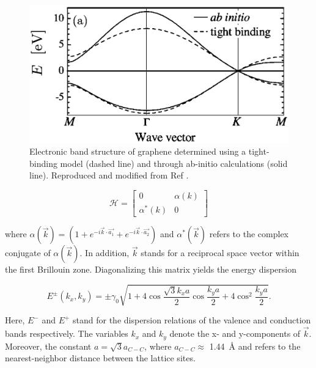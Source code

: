 \begin{figure}[h]
	\centering
	\includegraphics[scale=0.5]{images/chapter_optical_props/graphene_band_charlier}
	\caption{Electronic band structure of graphene determined using a tight-binding model (dashed line) and through ab-initio calculations (solid line). Reproduced and modified from Ref \cite{reich2002tight}.}
	\label{fig:graphene_band}
\end{figure}


\begin{equation}
	\mathcal{H} = \begin{bmatrix} 
	0 & \alpha(k) \\
	\alpha^*(k) & 0
	\end{bmatrix}
\end{equation}

where $\alpha(\vec{k}) = (1 + e^{-i \vec{k}\cdot \vec{a_1}} + e^{-i \vec{k}\cdot \vec{a_2}})$ and $\alpha^*(\vec{k})$ refers to the complex conjugate of $\alpha(\vec{k})$\cite{charlier2007electronic}. In addition, $\vec{k}$ stands for a reciprocal space vector within the first Brillouin zone. Diagonalizing this matrix yields the energy dispersion 

\begin{equation}
	E^{\pm} (k_x, k_y) = \pm \gamma_0 \sqrt{1 + 4 \cos\dfrac{\sqrt{3}k_x a}{2}\cos\dfrac{k_y a}{2} + 4 \cos^2 \dfrac{k_y a}{2}}.
	\label{eq:graphene_band}
\end{equation} 

 Here, $E^-$ and $E^+$ stand for the dispersion relations of the valence and conduction bands respectively. The variables $k_x$ and $k_y$ denote the x- and y-components of $\vec{k}$. Moreover, the constant $a = \sqrt{3}a_{C-C}$, where $a_{C-C} \approx$ \SI{1.44}{\angstrom} and refers to the nearest-neighbor distance between the lattice sites. 

